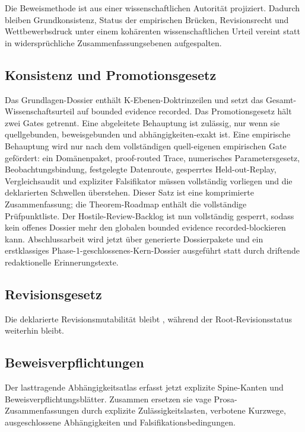Die Beweismethode ist aus einer wissenschaftlichen Autorität projiziert. Dadurch bleiben Grundkonsistenz, Status der empirischen Brücken, Revisionsrecht und Wettbewerbsdruck unter einem kohärenten wissenschaftlichen Urteil vereint statt in widersprüchliche Zusammenfassungsebenen aufgespalten.

\subsection{Konsistenz und Promotionsgesetz}
Das Grundlagen-Dossier enthält  K-Ebenen-Doktrinzeilen und setzt das Gesamt-Wissenschaftsurteil auf bounded evidence recorded.
Das Promotionsgesetz hält zwei Gates getrennt. Eine abgeleitete Behauptung ist zulässig, nur wenn sie quellgebunden, beweisgebunden und abhängigkeiten-exakt ist. Eine empirische Behauptung wird nur nach dem vollständigen quell-eigenen empirischen Gate gefördert: ein Domänenpaket, proof-routed Trace, numerisches Parametersgesetz, Beobachtungsbindung, festgelegte Datenroute, gesperrtes Held-out-Replay, Vergleichsaudit und expliziter Falsifikator müssen vollständig vorliegen und die deklarierten Schwellen überstehen. Dieser Satz ist eine komprimierte Zusammenfassung; die Theorem-Roadmap enthält die vollständige Prüfpunktliste.
Der Hostile-Review-Backlog ist nun vollständig gesperrt, sodass kein offenes Dossier mehr den globalen bounded evidence recorded-blockieren kann.
Abschlussarbeit wird jetzt über generierte Dossierpakete und ein erstklassiges Phase-1-geschlossenes-Kern-Dossier ausgeführt statt durch driftende redaktionelle Erinnerungstexte.

\subsection{Revisionsgesetz}
Die deklarierte Revisionsmutabilität bleibt , während der Root-Revisionsstatus weiterhin  bleibt.

\subsection{Beweisverpflichtungen}
Der lasttragende Abhängigkeitsatlas erfasst jetzt  explizite Spine-Kanten und  Beweisverpflichtungsblätter. Zusammen ersetzen sie vage Prosa-Zusammenfassungen durch explizite Zulässigkeitslasten, verbotene Kurzwege, ausgeschlossene Abhängigkeiten und Falsifikationsbedingungen.

